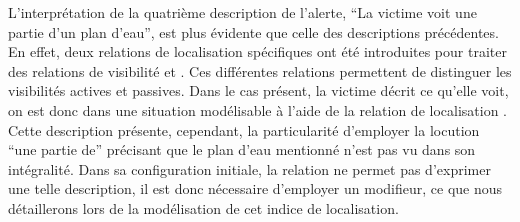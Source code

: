 L'interprétation de la quatrième description de l'alerte, \enquote{La
  victime voit une partie d'un plan d'eau}, est plus évidente que
celle des descriptions précédentes. En effet, deux relations de
localisation spécifiques ont été introduites pour traiter des
relations de visibilité  et
. Ces différentes relations permettent de
distinguer les visibilités actives et passives. Dans le cas présent,
la victime décrit ce qu'elle voit, on est donc dans une situation
modélisable à l'aide de la relation de localisation
. Cette description présente, cependant,
la particularité d'employer la locution \enquote{une partie de}
précisant que le plan d'eau mentionné n'est pas vu dans son
intégralité. Dans sa configuration initiale, la relation
 ne permet pas d'exprimer une telle
description, il est donc nécessaire d'employer un modifieur, ce que
nous détaillerons lors de la modélisation de cet indice de
localisation.

